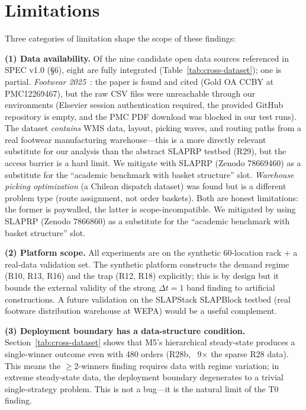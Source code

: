 \documentclass[11pt,a4paper]{article}
\begin{document}
\section{Limitations}\label{sec:limitations}

Three categories of limitation shape the scope of these findings:

\textbf{(1) Data availability.} Of the nine candidate open data sources
referenced in SPEC v1.0 (\S 6), eight are fully integrated (Table~\ref{tab:cross-dataset});
one is partial. \emph{Footwear 2025}~\citep{deassis2025footwear}: the paper
\cite{deassis2025footwear} is found and cited (Gold OA CCBY at PMC12269467),
but the raw CSV files were unreachable through our environments (Elsevier
session authentication required, the provided GitHub repository is empty,
and the PMC PDF download was blocked in our test runs). The dataset
\emph{contains} WMS data, layout, picking waves, and routing paths from
a real footwear manufacturing warehouse---this is a more directly
relevant substitute for our analysis than the abstract SLAPRP testbed
(R29), but the access barrier is a hard limit. We mitigate with SLAPRP
(Zenodo 78669460) as a substitute for the ``academic benchmark with
basket structure'' slot. \emph{Warehouse picking
optimization} (a Chilean dispatch dataset) was found but is a different
problem type (route assignment, not order baskets). Both are honest
limitations: the former is paywalled, the latter is scope-incompatible.
We mitigated by using SLAPRP (Zenodo 7866860) as a substitute for the
``academic benchmark with basket structure'' slot.

\textbf{(2) Platform scope.} All experiments are on the synthetic
60-location rack + a real-data validation set. The synthetic platform
constructs the demand regime (R10, R13, R16) and the trap (R12, R18)
explicitly; this is by design but it bounds the external validity of
the strong $\Delta t=1$ band finding to artificial constructions. A
future validation on the SLAPStack SLAPBlock testbed (real footware
distribution warehouse at WEPA) would be a useful complement.

\textbf{(3) Deployment boundary has a data-structure condition.}
Section~\ref{tab:cross-dataset} shows that M5's hierarchical steady-state
produces a single-winner outcome even with 480 orders (R28b, ~9$\times$ the
sparse R28 data). This means the $\geq 2$-winners finding requires data
with regime variation; in extreme steady-state data, the deployment
boundary degenerates to a trivial single-strategy problem. This is
not a bug---it is the natural limit of the T0 finding.
\end{document}
